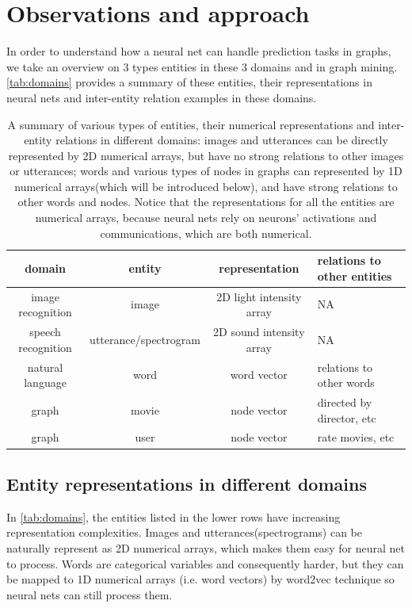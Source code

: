 \documentclass{article}
\begin{document}
\section{Observations and approach}
In order to understand how a neural net can handle prediction tasks in graphs, we take an overview on 3 types entities in these 3 domains and in graph mining. \autoref{tab:domains} provides a summary of these entities, their representations in neural nets and inter-entity relation examples in these domains.
\begin{table}[H]
	\centering
	\begin{tabularx}{\textwidth}{ |c|c|c|X| }
		\hline domain & entity & representation & relations to other entities 
		\\ 
		\hline image recognition & image & 2D light intensity array & NA \\ 
		\hline speech recognition & utterance/spectrogram & 2D sound intensity array & NA \\ 
		\hline natural language & word & word vector & relations to other words \\ 
		\hline graph & movie & node vector & directed by director, etc \\ 
		\hline graph & user & node vector & rate movies, etc \\
		\hline
	\end{tabularx}
	\caption{A summary of various types of entities, their numerical representations and inter-entity relations in different domains: images and utterances can be directly represented by 2D numerical arrays, but have no strong relations to other images or utterances; words and various types of nodes in graphs can represented by 1D numerical arrays(which will be introduced below), and have strong relations to other words and nodes. Notice that the representations for all the entities are numerical arrays, because neural nets rely on neurons' activations and communications, which are both numerical.}
	\label{tab:domains}
\end{table}

\subsection{Entity representations in different domains}
In \autoref{tab:domains}, the entities listed in the lower rows have increasing representation complexities. Images and utterances(spectrograms) can be naturally represent as 2D numerical arrays, which makes them easy for neural net to process. Words are categorical variables and consequently harder, but they can be mapped to 1D numerical arrays (i.e. word vectors) by word2vec technique \cite{mikolov2013efficient} so neural nets can still process them.
\end{document}
